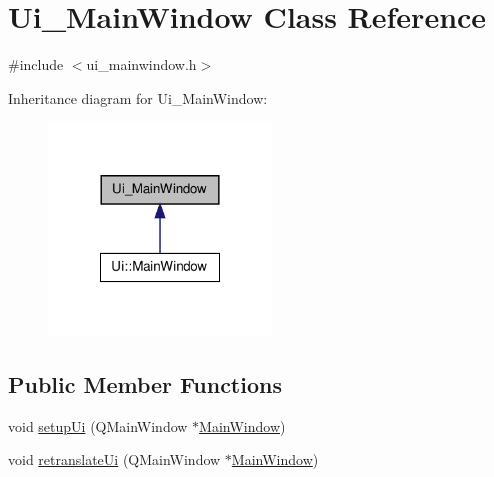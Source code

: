 \hypertarget{classUi__MainWindow}{
\section{Ui\_\-MainWindow Class Reference}
\label{classUi__MainWindow}
}


{\ttfamily \#include $<$ui\_\-mainwindow.h$>$}



Inheritance diagram for Ui\_\-MainWindow:
\nopagebreak
\begin{figure}[H]
\begin{center}
\leavevmode
\includegraphics[width=168pt]{classUi__MainWindow__inherit__graph}
\end{center}
\end{figure}
\subsection*{Public Member Functions}
\begin{DoxyCompactItemize}
\item 
void \hyperlink{classUi__MainWindow_acf4a0872c4c77d8f43a2ec66ed849b58}{setupUi} (QMainWindow $\ast$\hyperlink{classMainWindow}{MainWindow})
\item 
void \hyperlink{classUi__MainWindow_a097dd160c3534a204904cb374412c618}{retranslateUi} (QMainWindow $\ast$\hyperlink{classMainWindow}{MainWindow})
\end{DoxyCompactItemize}
